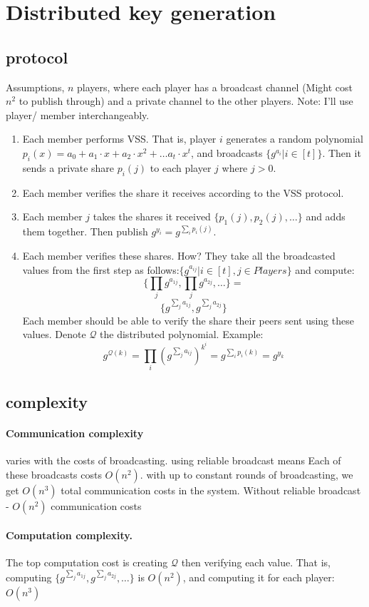 \section{Distributed key generation}
\subsection{protocol}
Assumptions, $n$ players, where each player has a broadcast channel (Might cost $n^2$ to publish through) and
a private channel to the other players.
Note: I'll use player/ member interchangeably.
\begin{enumerate}
  \item Each member performs VSS.
  That is, player $i$ generates a random polynomial 
  $p_{i}(x)=a_0+a_1\cdot x +a_2\cdot x^2 +\dots a_t\cdot x^t$, and broadcasts $ \{g^{a_i} | i \in [t]\}$.
  Then it sends a private share $ p_{i}(j)$ to each player $j$ where $j>0$.
  \item Each member verifies the share it receives according to the VSS protocol.
  \item Each member $j$ takes the shares it received $\{p_{1}(j),p_{2}(j),\dots\}$ and adds them together. 
  Then publish $ g^{y_i}=g^{\sum_{i}{p_{i}(j)}}$.
  \item Each member verifies these shares. How? They take all the broadcasted values from the first step
  as follows:$ \{g^{a_{ij}} | i \in [t], j \in Players\}$ and compute:
  $$\{\prod_{j}{ g^{a_{1j}}}, \prod_{j}{ g^{a_{2j}}},\dots\}=$$
  $$\{ g^{\sum_{j}{a_{1j}}}, g^{\sum_{j}{a_{2j}}}\} $$ 
  Each member should be able to verify the share their peers sent using these values.
  Denote $\mathcal{Q}$ the distributed polynomial.
  Example:$$g^{\mathcal{Q}(k)}=\prod_{i}(g^{\sum_{j}{a_{ij}}})^{k^i}= g^{\sum_{i}{p_i(k)}}=g^{y_k}$$
\end{enumerate}
\subsection{complexity}
\paragraph{Communication complexity} varies with the costs of broadcasting. using reliable broadcast means
Each of these broadcasts costs $O(n^2)$. with up to constant rounds of broadcasting,
 we get $O(n^3)$ total communication costs in the system. 
 Without reliable broadcast - $O(n^2)$ communication costs
 \paragraph{Computation complexity.} The top computation cost is creating $\mathcal{Q}$ then verifying each value.
 That is, computing $ \{ g^{\sum_{j}{a_{1j}}}, g^{\sum_{j}{a_{2j}}},\dots\} $  is $O(n^2)$, and computing it for each player: $O(n^3)$ 



